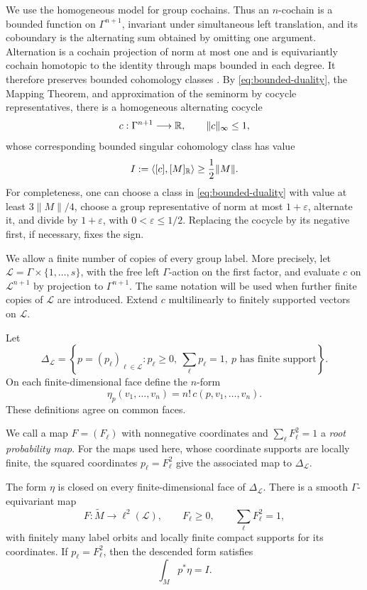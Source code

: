 We use the homogeneous model for group cochains. Thus an \(n\)-cochain
is a bounded function on \(\Gamma^{n+1}\), invariant under simultaneous
left translation, and its coboundary is the alternating sum obtained by
omitting one argument. Alternation is a cochain projection of norm at
most one and is equivariantly cochain homotopic to the identity through
maps bounded in each degree. It therefore preserves bounded cohomology
classes \cite[Section~4.10, Proposition~4.26]{Frigerio2016}.
By \eqref{eq:bounded-duality}, the Mapping Theorem, and
approximation of the seminorm by cocycle representatives, there is a
homogeneous alternating cocycle
\[
  c:\Gamma^{n+1}\longrightarrow\mathbb R,\qquad \|c\|_\infty\le1,
\]
whose corresponding bounded singular cohomology class has value
\begin{equation}
  I:=\langle[c],[M]_{\mathbb R}\rangle\ge\frac12\|M\|.
  \label{eq:detector-value}
\end{equation}
For completeness, one can choose a class in
\eqref{eq:bounded-duality} with value at least \(3\|M\|/4\), choose a
group representative of norm at most \(1+\varepsilon\), alternate it,
and divide by \(1+\varepsilon\), with \(0<\varepsilon\le1/2\). Replacing
the cocycle by its negative first, if necessary, fixes the sign.

We allow a finite number of copies of every group label. More
precisely, let \(\mathcal L=\Gamma\times\{1,\ldots,s\}\), with the free
left \(\Gamma\)-action on the first factor, and evaluate \(c\) on
\(\mathcal L^{n+1}\) by projection to \(\Gamma^{n+1}\). The same
notation will be used when further finite copies of \(\mathcal L\) are
introduced. Extend \(c\) multilinearly to finitely supported vectors
on \(\mathcal L\).

Let
\[
\Delta_{\mathcal L}=
\left\{p=(p_\ell)_{\ell\in\mathcal L}:
 p_\ell\ge0,\ \sum_\ell p_\ell=1,\ p\text{ has finite support}\right\}.
\]
On each finite-dimensional face define the \(n\)-form
\begin{equation}
\eta_p(v_1,\ldots,v_n)=n!\,c(p,v_1,\ldots,v_n).
\label{eq:probability-form}
\end{equation}
These definitions agree on common faces.

We call a map \(F=(F_\ell)\) with nonnegative coordinates and
\(\sum_\ell F_\ell^2=1\) a \emph{root probability map}. For the maps
used here, whose coordinate supports are locally finite, the squared
coordinates \(p_\ell=F_\ell^2\) give the associated map to
\(\Delta_{\mathcal L}\).

\begin{proposition}
\label{prop:detector}
The form \(\eta\) is closed on every finite-dimensional face of
\(\Delta_{\mathcal L}\). There is a smooth \(\Gamma\)-equivariant map
\[
 F:\widetilde M\longrightarrow\ell^2(\mathcal L),\qquad
 F_\ell\ge0,\qquad \sum_\ell F_\ell^2=1,
\]
with finitely many label orbits and locally finite compact supports for
its coordinates. If \(p_\ell=F_\ell^2\), then the descended form
satisfies
\begin{equation}
  \int_M p^*\eta=I.
  \label{eq:detector-integral}
\end{equation}
\end{proposition}

